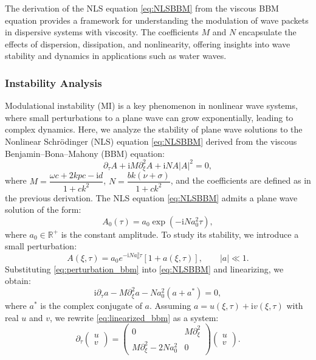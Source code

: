 \documentclass[alpha-refs, 12pt]{wiley-article}
\newcommand{\ui}{\mathrm{i}}
\begin{document}
The derivation of the NLS equation \eqref{eq:NLSBBM} from the viscous BBM equation provides a framework for understanding the modulation of wave packets in dispersive systems with viscosity. The coefficients $M$ and $N$ encapsulate the effects of dispersion, dissipation, and nonlinearity, offering insights into wave stability and dynamics in applications such as water waves.

\subsubsection{Instability Analysis}

Modulational instability (MI) is a key phenomenon in nonlinear wave systems, where small perturbations to a plane wave can grow exponentially, leading to complex dynamics. Here, we analyze the stability of plane wave solutions to the Nonlinear Schrödinger (NLS) equation \eqref{eq:NLSBBM} derived from the viscous Benjamin--Bona--Mahony (BBM) equation:
\[
  \partial_\tau A + \ui M \partial_\xi^2 A + \ui N A |A|^2 = 0,
\]
where $M = \dfrac{\omega c + 2 k p c - \ui d}{1 + c k^2}$, $N = \dfrac{b k (\nu + \sigma)}{1 + c k^2}$, and the coefficients are defined as in the previous derivation. The NLS equation \eqref{eq:NLSBBM} admits a plane wave solution of the form:
\begin{equation}\label{eq:plane_wave_bbm}
  A_0(\tau) = a_0 \exp(-\ui N a_0^2 \tau),
\end{equation}
where $a_0 \in \mathbb{R}^+$ is the constant amplitude. To study its stability, we introduce a small perturbation:
\begin{equation}\label{eq:perturbation_bbm}
  A(\xi, \tau) = a_0 e^{-\ui N a_0^2 \tau} [1 + a(\xi, \tau)], \qquad |a| \ll 1.
\end{equation}
Substituting \eqref{eq:perturbation_bbm} into \eqref{eq:NLSBBM} and linearizing, we obtain:
\begin{equation}\label{eq:linearized_bbm}
  \ui \partial_\tau a - M \partial_\xi^2 a - N a_0^2 (a + a^*) = 0,
\end{equation}
where $a^*$ is the complex conjugate of $a$. Assuming $a = u(\xi, \tau) + \ui v(\xi, \tau)$ with real $u$ and $v$, we rewrite \eqref{eq:linearized_bbm} as a system:
\begin{equation}\label{eq:matrix_bbm}
  \partial_\tau \begin{pmatrix} u \\ v \end{pmatrix} = \begin{pmatrix}
  0 & M \partial_\xi^2 \\
  M \partial_\xi^2 - 2 N a_0^2 & 0
\end{pmatrix} \begin{pmatrix} u \\ v \end{pmatrix}.
\end{equation}
\end{document}
